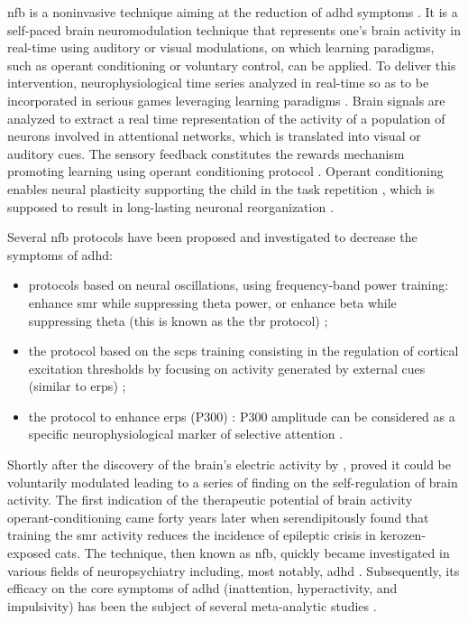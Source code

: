 \gls{nfb} is a noninvasive technique aiming at the reduction of \gls{adhd} symptoms \citep{Arns2015, Steffert2010,
Marzbani2016}. It is a self-paced brain neuromodulation technique that represents one's brain activity in real-time
using auditory or visual modulations, on which learning paradigms, such as operant conditioning
\citep{Reynolds1975} or voluntary control, can be applied. To deliver this intervention, neurophysiological time series 
analyzed in real-time so as to be incorporated in serious games leveraging learning paradigms \citep{Wang2010}. 
Brain signals are analyzed to extract a real time representation of the activity of a population of
neurons involved in attentional networks, which is translated into visual or auditory cues. The sensory feedback
constitutes the rewards mechanism promoting learning using operant conditioning protocol \citep{Sherlin2011}. Operant
conditioning enables neural plasticity supporting the child in the task repetition \citep{Skinner1961}, which is supposed
to result in long-lasting neuronal reorganization \citep{VanDoren2017}. 

Several \gls{nfb} protocols have been proposed and investigated to decrease the symptoms of \gls{adhd}:
\begin{itemize} 
  \item protocols based on neural oscillations, using frequency-band power training: enhance \gls{smr} while
    suppressing theta power, or enhance beta while suppressing theta (this is known as
    the \gls{tbr} protocol) \citep{Lubar1976, Arns2013}; 
  \item the protocol based on the \glspl{scp} training consisting in the regulation of
    cortical excitation thresholds by focusing on activity generated by external cues (similar to \glspl{erp})
    \citep{Heinrich2004, Banaschewski2007}; 
  \item the protocol to enhance \glspl{erp} (P300) \citep{Fouillen2017}: P300 amplitude can be considered as a specific
    neurophysiological marker of selective attention \citep{RolandLeBouedec}.  
\end{itemize} 

Shortly after the discovery of the brain's electric activity by \citet{Berger1929}, \citet{Durup1935} proved it could be
voluntarily modulated leading to a series of finding on the self-regulation of brain activity. The first indication of the
therapeutic potential of brain activity operant-conditioning came forty years later when \citet{Sterman1974} serendipitously 
found that training the \gls{smr} activity reduces the incidence of epileptic crisis in kerozen-exposed cats. The technique, 
then known as \gls{nfb}, quickly became investigated in various fields of neuropsychiatry including, most notably, \gls{adhd} 
\citep{Lubar1976, Rossiter1995, Linden1996, Maurizio2014}. Subsequently, its efficacy on the core symptoms of \gls{adhd} 
(inattention, hyperactivity, and impulsivity) has been the subject of several meta-analytic studies \citep{Loo2005, Lofthouse2012, 
Arns2009, Micoulaud2014, Sonuga-Barke2013}. 

